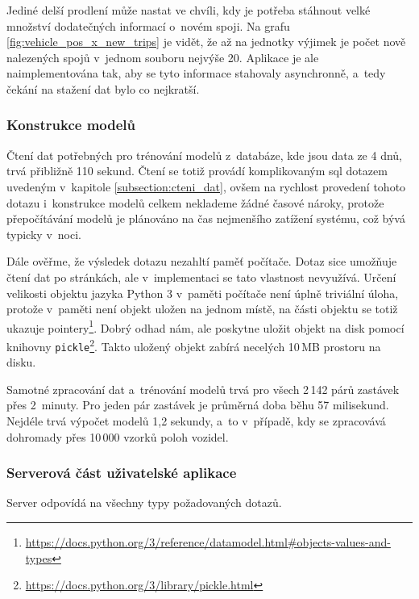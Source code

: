 \bigbreak

Jediné delší prodlení může nastat ve chvíli, kdy je potřeba stáhnout velké množství dodatečných informací o~novém spoji. Na grafu \ref{fig:vehicle_pos_x_new_trips} je vidět, že až na jednotky výjimek je počet nově nalezených spojů v~jednom souboru nejvýše 20. Aplikace je ale naimplementována tak, aby se tyto informace stahovaly asynchronně, a~tedy čekání na stažení dat bylo co nejkratší.


\subsubsection{Konstrukce modelů}

Čtení dat potřebných pro trénování modelů z~databáze, kde jsou data ze 4 dnů, trvá přibližně 110 sekund. Čtení se totiž provádí komplikovaným \gls{sql} dotazem uvedeným v~kapitole \ref{subsection:cteni_dat}, ovšem na rychlost provedení tohoto dotazu i~konstrukce modelů celkem neklademe žádné časové nároky, protože přepočítávání modelů je plánováno na čas nejmenšího zatížení systému, což bývá typicky v~noci.

\bigbreak

Dále ověřme, že výsledek dotazu nezahltí paměť počítače. Dotaz sice umožňuje čtení dat po stránkách, ale v~implementaci se tato vlastnost nevyužívá. Určení velikosti objektu jazyka Python 3 v~paměti počítače není úplně triviální úloha, protože v~paměti není objekt uložen na jednom místě, na části objektu se totiž ukazuje pointery\footnote{\url{https://docs.python.org/3/reference/datamodel.html\#objects-values-and-types}}. Dobrý odhad nám, ale poskytne uložit objekt na disk pomocí knihovny \verb-pickle-\footnote{\url{https://docs.python.org/3/library/pickle.html}}. Takto uložený objekt zabírá necelých 10\,MB prostoru na disku.


\bigbreak

Samotné zpracování dat a~trénování modelů trvá pro všech 2\,142 párů zastávek přes 2~minuty. Pro jeden pár zastávek je průměrná doba běhu 57 milisekund. Nejdéle trvá výpočet modelů 1,2 sekundy, a~to v~případě, kdy se zpracovává dohromady přes 10\,000 vzorků poloh vozidel.


\subsubsection{Serverová část uživatelské aplikace}

Server odpovídá na všechny typy požadovaných dotazů.

